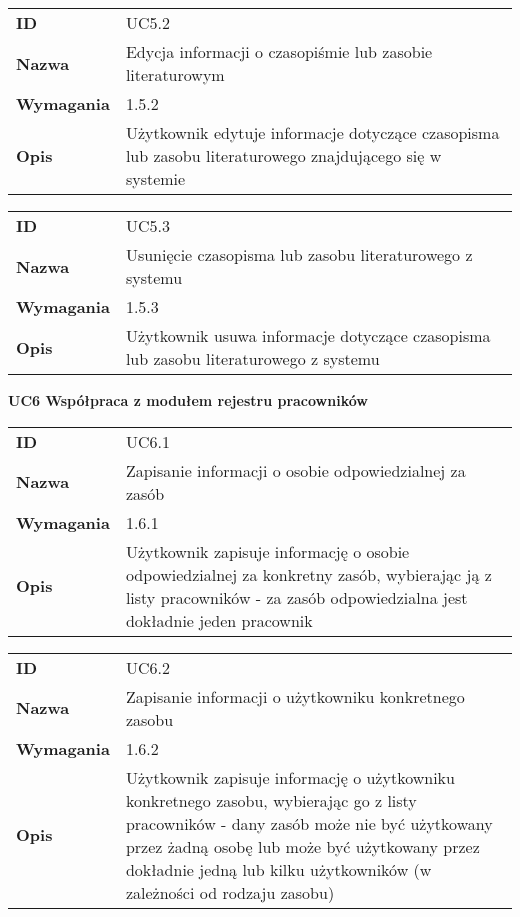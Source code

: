\vspace{.05\textheight}

\begin{tabular}{p{}p{}}
\hfill {\bf ID} & UC5.2 \\
\hfill {\bf Nazwa} & Edycja informacji o czasopiśmie lub zasobie literaturowym  \\
\hfill {\bf Wymagania} & 1.5.2 \\
\hfill {\bf Opis} &  Użytkownik edytuje informacje dotyczące czasopisma lub zasobu literaturowego znajdującego się w systemie \\
\end{tabular}

\vspace{.05\textheight}

\begin{tabular}{p{}p{}}
\hfill {\bf ID} & UC5.3 \\
\hfill {\bf Nazwa} & Usunięcie czasopisma lub zasobu literaturowego z systemu \\
\hfill {\bf Wymagania} & 1.5.3 \\
\hfill {\bf Opis} & Użytkownik usuwa informacje dotyczące czasopisma lub zasobu literaturowego z systemu \\
\end{tabular}

\vspace{.03\textheight}
\begin{center}
  {\Large\bf UC6 Współpraca z modułem rejestru pracowników}
\end{center}
\vspace{.02\textheight}

\begin{tabular}{p{}p{}}
\hfill {\bf ID} & UC6.1 \\
\hfill {\bf Nazwa} &  Zapisanie informacji o osobie odpowiedzialnej za zasób \\
\hfill {\bf Wymagania} & 1.6.1 \\
\hfill {\bf Opis} & Użytkownik zapisuje informację o osobie odpowiedzialnej za konkretny zasób, wybierając ją z listy pracowników - za zasób odpowiedzialna jest dokładnie jeden pracownik \\
\end{tabular}

\vspace{.05\textheight}

\begin{tabular}{p{}p{}}
\hfill {\bf ID} & UC6.2 \\
\hfill {\bf Nazwa} & Zapisanie informacji o użytkowniku konkretnego zasobu \\
\hfill {\bf Wymagania} & 1.6.2 \\
\hfill {\bf Opis} &  Użytkownik zapisuje informację o użytkowniku konkretnego zasobu,  wybierając go z listy pracowników - dany zasób może nie być użytkowany przez żadną osobę lub może być użytkowany przez dokładnie jedną lub kilku użytkowników (w zależności od rodzaju zasobu) \\
\end{tabular}

